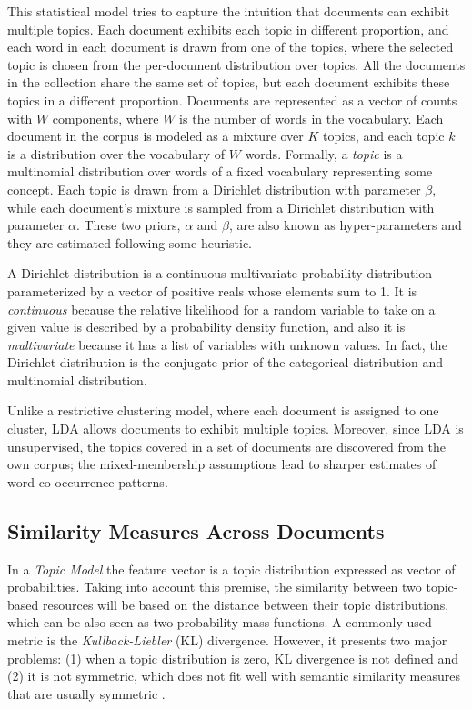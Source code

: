 This statistical model tries to capture the intuition that documents can exhibit multiple topics. Each document exhibits each topic in different proportion, and each word in each document is drawn from one of the topics, where the selected topic is chosen from the per-document distribution over topics. All the documents in the collection share the same set of topics, but each document exhibits these topics in a different proportion. Documents are  represented as a vector of counts with $W$ components, where $W$ is the number of words in the vocabulary. Each document in the corpus is modeled as a mixture over $K$ topics, and each topic $k$ is a distribution over the vocabulary of $W$ words. Formally, a \textit{topic} is a multinomial distribution over words of a fixed vocabulary representing some concept. Each topic is drawn from a Dirichlet distribution with parameter $\beta$, while each document's mixture is sampled from a Dirichlet distribution with parameter $\alpha$. These two priors, $\alpha$ and $\beta$, are also known as hyper-parameters and they are estimated following some heuristic.

A Dirichlet distribution is a continuous multivariate probability distribution parameterized by a vector of positive reals whose elements sum to 1.  It is \textit{continuous} because the relative likelihood for a random variable to take on a given value is described by a probability density function, and also it is \textit{multivariate} because it has a list of variables with unknown values. In fact, the Dirichlet distribution is the conjugate prior of the categorical distribution and multinomial distribution.

Unlike a restrictive clustering model, where each document is assigned to one cluster, LDA allows documents to exhibit multiple topics. Moreover, since LDA is unsupervised, the topics covered in a set of documents are discovered from the own corpus; the mixed-membership assumptions lead to sharper estimates of word co-occurrence patterns.

\subsection{Similarity Measures Across Documents}
\label{sec:similarity}
In a \textit{Topic Model} the feature vector is a topic distribution expressed as vector of probabilities. Taking into account this premise, the similarity between two topic-based resources will be based on the distance between their topic distributions, which can be also seen as two probability mass functions. A commonly used metric is the \textit{Kullback-Liebler} (KL) divergence. However, it presents two major problems: (1) when a topic distribution is zero, KL divergence is not defined and (2) it is not symmetric, which does not fit well with semantic similarity measures that are usually symmetric \cite{Rus2013}.


